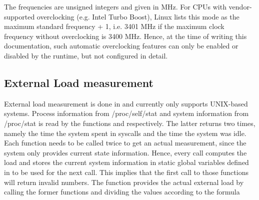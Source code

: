 %		

The frequencies are unsigned integers and given in MHz. For CPUs with vendor-supported overclocking (e.g. Intel Turbo Boost), Linux lists this mode as the maximum standard frequency + 1, i.e. 3401 MHz if the maximum clock frequency without overclocking is 3400 MHz. Hence, at the time of writing this documentation, such automatic overclocking features can only be enabled or disabled by the runtime, but not configured in detail.

\subsection{External Load measurement}

External load measurement is done in  and currently only supports UNIX-based systems. Process information from
/proc/self/stat and system information from /proc/stat is read by the functions
 and  respectively.
The latter returns two times, namely the time the system spent in syscalls and
the time the system was idle. Each function needs to be called twice to get an
actual measurement, since the system only provides current state information.
Hence, every call computes the load and stores the current system information
in static global variables defined in  to be used for the next
call. This implies that the first call to those functions will return invalid
numbers. The function  provides the actual
external load by calling the former functions and dividing the values according
to the formula


